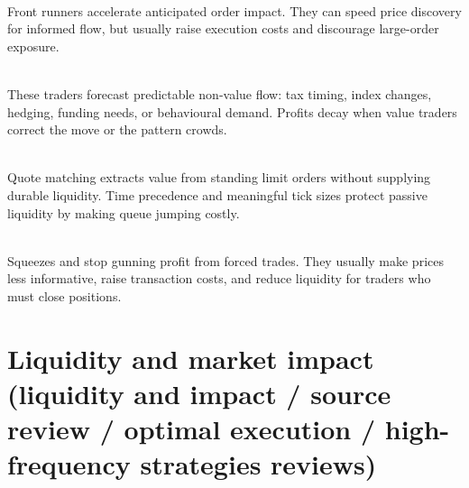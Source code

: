 \documentclass[a4paper,oneside,openany]{book}
\begin{document}
\begin{mechanism} \\
Front runners accelerate anticipated order impact. They can speed price discovery for informed flow, but usually raise execution costs and discourage large-order exposure.
\end{mechanism}

\begin{mechanism} \\
These traders forecast predictable non-value flow: tax timing, index changes, hedging, funding needs, or behavioural demand. Profits decay when value traders correct the move or the pattern crowds.
\end{mechanism}

\begin{caveat} \\
Quote matching extracts value from standing limit orders without supplying durable liquidity. Time precedence and meaningful tick sizes protect passive liquidity by making queue jumping costly.
\end{caveat}

\begin{caveat} \\
Squeezes and stop gunning profit from forced trades. They usually make prices less informative, raise transaction costs, and reduce liquidity for traders who must close positions.
\end{caveat}

\section*{Liquidity and market impact (liquidity and impact / source review / optimal execution / high-frequency strategies reviews)}
\end{document}
